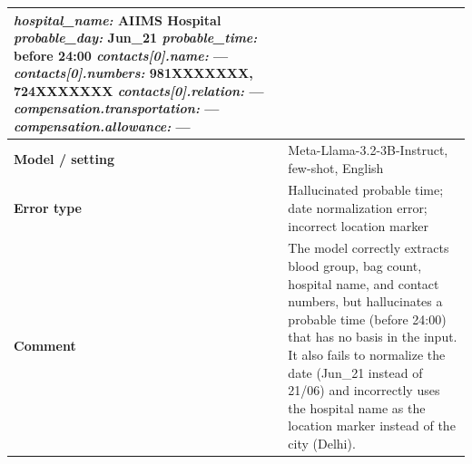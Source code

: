 \documentclass[11pt]{article}
\begin{document}
\begin{table}[t]
\begin{tabularx}{\textwidth}{@{}p{}XX@{}}
{\textit{hospital\_name:} AIIMS Hospital\newline
\textit{probable\_day:} Jun\_21\newline
\textit{probable\_time:} before 24:00\newline
\textit{contacts[0].name:} ---\newline
\textit{contacts[0].numbers:} 981XXXXXXX, 724XXXXXXX\newline
\textit{contacts[0].relation:} ---\newline
\textit{compensation.transportation:} ---\newline
\textit{compensation.allowance:} ---
} \\
\midrule
\textbf{Model / setting} & \multicolumn{2}{p{0.75\textwidth}}{Meta-Llama-3.2-3B-Instruct, few-shot, English} \\
\textbf{Error type} & \multicolumn{2}{p{0.75\textwidth}}{Hallucinated probable time; date normalization error; incorrect location marker} \\
\textbf{Comment} & \multicolumn{2}{p{0.75\textwidth}}{The model correctly extracts blood group, bag count, hospital name, and contact numbers, but hallucinates a probable time (before 24:00) that has no basis in the input. It also fails to normalize the date (Jun\_21 instead of 21/06) and incorrectly uses the hospital name as the location marker instead of the city (Delhi).} \\
\bottomrule
\end{tabularx}
\end{table}
\end{document}
